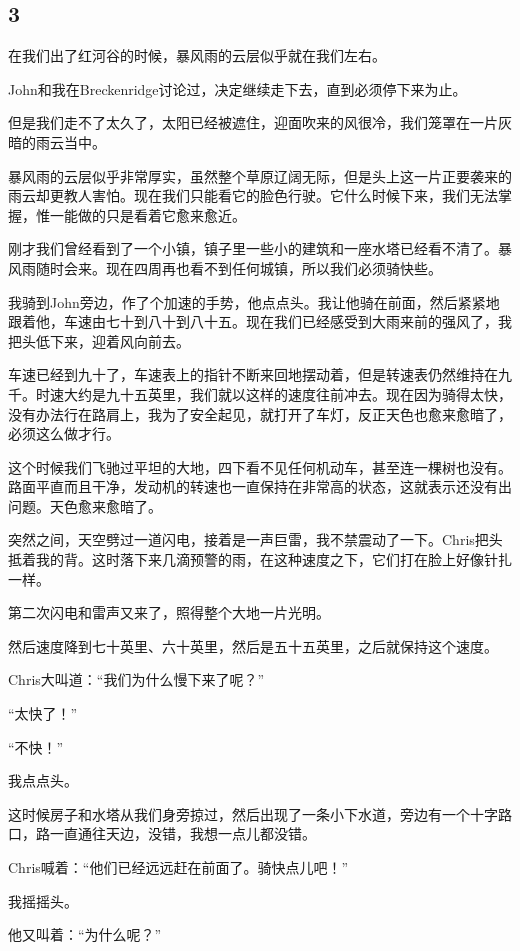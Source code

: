\documentclass[UTF8]{article}
\begin{document}
\subsection*{3}
\par 在我们出了红河谷的时候，暴风雨的云层似乎就在我们左右。
\par John和我在Breckenridge讨论过，决定继续走下去，直到必须停下来为止。
\par 但是我们走不了太久了，太阳已经被遮住，迎面吹来的风很冷，我们笼罩在一片灰暗的雨云当中。
\par 暴风雨的云层似乎非常厚实，虽然整个草原辽阔无际，但是头上这一片正要袭来的雨云却更教人害怕。现在我们只能看它的脸色行驶。它什么时候下来，我们无法掌握，惟一能做的只是看着它愈来愈近。
\par 刚才我们曾经看到了一个小镇，镇子里一些小的建筑和一座水塔已经看不清了。暴风雨随时会来。现在四周再也看不到任何城镇，所以我们必须骑快些。
\par 我骑到John旁边，作了个加速的手势，他点点头。我让他骑在前面，然后紧紧地跟着他，车速由七十到八十到八十五。现在我们已经感受到大雨来前的强风了，我把头低下来，迎着风向前去。
\par 车速已经到九十了，车速表上的指针不断来回地摆动着，但是转速表仍然维持在九千。时速大约是九十五英里，我们就以这样的速度往前冲去。现在因为骑得太快，没有办法行在路肩上，我为了安全起见，就打开了车灯，反正天色也愈来愈暗了，必须这么做才行。
\par 这个时候我们飞驰过平坦的大地，四下看不见任何机动车，甚至连一棵树也没有。路面平直而且干净，发动机的转速也一直保持在非常高的状态，这就表示还没有出问题。天色愈来愈暗了。
\par 突然之间，天空劈过一道闪电，接着是一声巨雷，我不禁震动了一下。Chris把头抵着我的背。这时落下来几滴预警的雨，在这种速度之下，它们打在脸上好像针扎一样。
\par 第二次闪电和雷声又来了，照得整个大地一片光明。
\par 然后速度降到七十英里、六十英里，然后是五十五英里，之后就保持这个速度。
\par Chris大叫道：“我们为什么慢下来了呢？”
\par “太快了！”
\par “不快！”
\par 我点点头。
\par 这时候房子和水塔从我们身旁掠过，然后出现了一条小下水道，旁边有一个十字路口，路一直通往天边，没错，我想一点儿都没错。
\par Chris喊着：“他们已经远远赶在前面了。骑快点儿吧！”
\par 我摇摇头。
\par 他又叫着：“为什么呢？”
\end{document}
